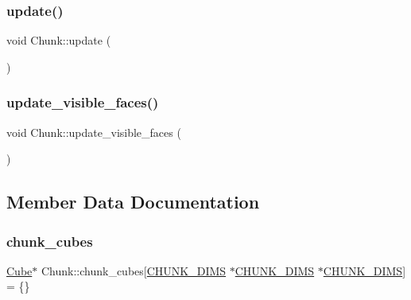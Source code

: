 \subsubsection{\texorpdfstring{update()}{update()}}
{\footnotesize\ttfamily void Chunk\+::update (\begin{DoxyParamCaption}{ }\end{DoxyParamCaption})}

\mbox{\label{classChunk_a14e0df6744414d474f44bc562c0883bb}} 
\subsubsection{\texorpdfstring{update\+\_\+visible\+\_\+faces()}{update\_visible\_faces()}}
{\footnotesize\ttfamily void Chunk\+::update\+\_\+visible\+\_\+faces (\begin{DoxyParamCaption}{ }\end{DoxyParamCaption})\hspace{0.3cm}{\ttfamily [private]}}



\subsection{Member Data Documentation}
\mbox{\label{classChunk_aaf87542e059f3c86960e6f7b5b568daf}} 
\subsubsection{\texorpdfstring{chunk\+\_\+cubes}{chunk\_cubes}}
{\footnotesize\ttfamily \mbox{\hyperlink{classCube}{Cube}}$\ast$ Chunk\+::chunk\+\_\+cubes\mbox{[}\mbox{\hyperlink{World_8hpp_a0e16b82054c4942f52ca2e1254dcc420}{C\+H\+U\+N\+K\+\_\+\+D\+I\+MS}} $\ast$\mbox{\hyperlink{World_8hpp_a0e16b82054c4942f52ca2e1254dcc420}{C\+H\+U\+N\+K\+\_\+\+D\+I\+MS}} $\ast$\mbox{\hyperlink{World_8hpp_a0e16b82054c4942f52ca2e1254dcc420}{C\+H\+U\+N\+K\+\_\+\+D\+I\+MS}}\mbox{]} = \{\}\hspace{0.3cm}{\ttfamily [private]}}

\mbox{\label{classChunk_acd416e07f98045f3a15354326754cc13}} 
